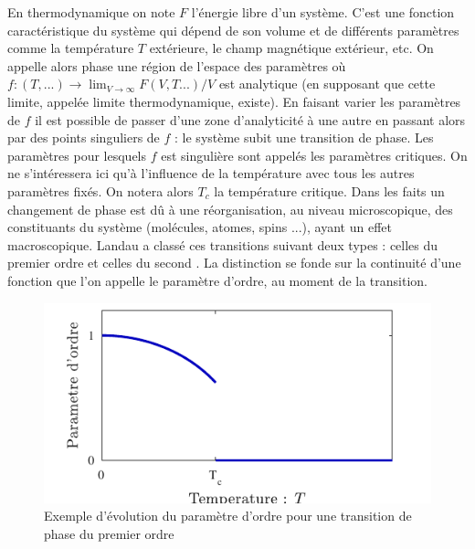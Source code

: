 \documentclass[10.5pt]{article}
\begin{document}
\begin{multicols*}{2}
En thermodynamique on note $F$ l'énergie libre d'un système. C'est une fonction caractéristique du système qui dépend de son volume et de différents paramètres comme la température $T$ extérieure, le champ magnétique extérieur, etc. On appelle alors phase une région de l'espace des paramètres où $f : (T, ...) \to \lim_{V \to \infty} F(V,T...)/V$ est analytique (en supposant que cette limite, appelée limite thermodynamique, existe). En faisant varier les paramètres de $f$ il est possible de passer d'une zone d'analyticité à une autre en passant alors par des points singuliers de $f$ : le système subit une transition de phase. Les paramètres pour lesquels $f$ est singulière sont appelés les paramètres critiques. On ne s'intéressera ici qu'à l'influence de la température avec tous les autres paramètres fixés. On notera alors $T_c$ la température critique. Dans les faits un changement de phase est dû à une réorganisation, au niveau microscopique, des constituants  du système (molécules, atomes, spins ...), ayant un effet macroscopique. Landau a classé ces transitions suivant deux types : celles du premier ordre et celles du second \cite{toledano1987landau}. La distinction se fonde sur la continuité d'une fonction que l'on appelle le paramètre d'ordre, au moment de la transition. 
 \begin{figure}[H]
\begin{center}
\includegraphics[width=0.95\columnwidth]{aimantation2.pdf}
\caption{Exemple d'évolution du paramètre d'ordre pour une transition de phase du premier ordre}
\label{fig:aimantation2}
\end{center}
\end{figure}
\vspace*{-11pt}

\end{multicols*}
\end{document}
